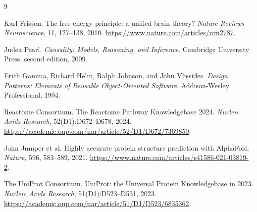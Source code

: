 \documentclass[11pt]{article}
\begin{document}
\begin{thebibliography}{9}

Karl Friston.
\newblock The free-energy principle: a unified brain theory?
\newblock \emph{Nature Reviews Neuroscience}, 11, 127--138, 2010.
\newblock \url{https://www.nature.com/articles/nrn2787}.

Judea Pearl.
\newblock \emph{Causality: Models, Reasoning, and Inference}.
\newblock Cambridge University Press, second edition, 2009.

Erich Gamma, Richard Helm, Ralph Johnson, and John Vlissides.
\newblock \emph{Design Patterns: Elements of Reusable Object-Oriented Software}.
\newblock Addison-Wesley Professional, 1994.

Reactome Consortium.
\newblock The Reactome Pathway Knowledgebase 2024.
\newblock \emph{Nucleic Acids Research}, 52(D1):D672--D678, 2024.
\newblock \url{https://academic.oup.com/nar/article/52/D1/D672/7369850}.

John Jumper et al.
\newblock Highly accurate protein structure prediction with AlphaFold.
\newblock \emph{Nature}, 596, 583--589, 2021.
\newblock \url{https://www.nature.com/articles/s41586-021-03819-2}.

The UniProt Consortium.
\newblock UniProt: the Universal Protein Knowledgebase in 2023.
\newblock \emph{Nucleic Acids Research}, 51(D1):D523--D531, 2023.
\newblock \url{https://academic.oup.com/nar/article/51/D1/D523/6835362}.

\end{thebibliography}
\end{document}
